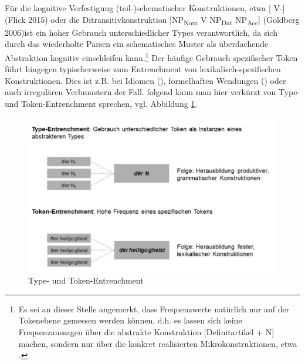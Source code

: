 Für die kognitive Verfestigung (teil-)schematischer Konstruktionen, 
etwa [ V-] (Flick 2015) oder die Ditransitivkonstruktion [NP\textsubscript{Nom} V NP\textsubscript{Dat} NP\textsubscript{Acc}] (Goldberg 2006)ist ein hoher Gebrauch unterschiedlicher Types verantwortlich, da sich durch das wiederholte Parsen ein schematisches Muster als überdachende Abstraktion kognitiv einschleifen kann.\footnote{Es sei an dieser Stelle angemerkt, dass Frequenzwerte natürlich nur auf der Tokenebene gemessen werden können, d.h. es lassen sich keine Frequenzaussagen über die abstrakte Konstruktion [Definitartikel + N] machen, sondern nur über die konkret realisierten Mikrokonstruktionen, etwa .} 
Der häufige Gebrauch spezifischer Token führt hingegen typischerweise zum Entrenchment von lexikalisch-spezifischen Konstruktionen. Dies ist z.B. bei Idiomen (), formelhaften Wendungen () oder auch irregulären Verbmustern der Fall. \textcite[103f.]{Ziem2013} folgend kann man hier verkürzt von Type- und Token-Entrenchment sprechen, vgl. Abbildung \ref{abb:type-token-entrechment}.

\begin{figure}
\begin{center}
  \includegraphics[width=12cm]{images/type-token-entrenchment-neu-sw.jpg}
\caption {Type- und Token-Entrenchment} 
\label{abb:type-token-entrechment}
\end{center}
\end{figure} 

